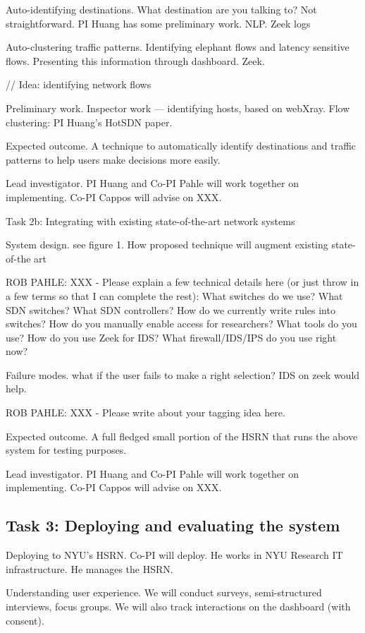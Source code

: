 Auto-identifying destinations. What destination are you talking to? Not straightforward. PI Huang has some preliminary work. NLP. Zeek logs

Auto-clustering traffic patterns. Identifying elephant flows and latency sensitive flows. Presenting this information through dashboard.  Zeek.

// Idea: identifying network flows

Preliminary work. Inspector work — identifying hosts, based on webXray. Flow clustering: PI Huang's HotSDN paper.

Expected outcome. A technique to automatically identify destinations and traffic patterns to help users make decisions more easily.

Lead investigator. PI Huang and Co-PI Pahle will work together on implementing. Co-PI Cappos will advise on XXX.


Task 2b: Integrating with existing state-of-the-art network systems

System design. see figure 1. How proposed technique will augment existing state-of-the art

ROB PAHLE: XXX - Please explain a few technical details here (or just throw in a few terms so that I can complete the rest):
What switches do we use?
What SDN switches? What SDN controllers?
How do we currently write rules into switches?
How do you manually enable access for researchers? What tools do you use?
How do you use Zeek for IDS?
What firewall/IDS/IPS do you use right now?

Failure modes. what if the user fails to make a right selection? IDS on zeek would help.

ROB PAHLE: XXX - Please write about your tagging idea here.

Expected outcome. A full fledged small portion of the HSRN that runs the above system for testing purposes.

Lead investigator. PI Huang and Co-PI Pahle will work together on implementing. Co-PI Cappos will advise on XXX.

\subsection{Task 3: Deploying and evaluating the system}

Deploying to NYU's HSRN. Co-PI will deploy. He works in NYU Research IT infrastructure. He manages the HSRN.

Understanding user experience. We will conduct surveys, semi-structured interviews, focus groups. We will also track interactions on the dashboard (with consent).

